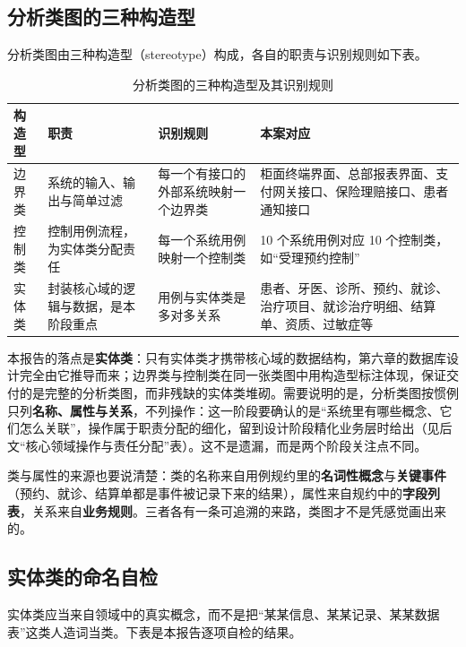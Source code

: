 \documentclass[11pt,a4paper]{ctexart}
\begin{document}
\subsection{分析类图的三种构造型}

分析类图由三种构造型（stereotype）构成，各自的职责与识别规则如下表。

\begin{table}[H]
\centering
\caption{分析类图的三种构造型及其识别规则}
\begin{tabularx}{\linewidth}{@{}L{1.8cm}L{4.0cm}L{3.9cm}X@{}}
\toprule
\textbf{\textcolor{adcblue!92}{构造型}} & \textbf{\textcolor{adcblue!92}{职责}} & \textbf{\textcolor{adcblue!92}{识别规则}} & \textbf{\textcolor{adcblue!92}{本案对应}} \\
\midrule
边界类 & 系统的输入、输出与简单过滤 & 每一个有接口的外部系统映射一个边界类 & 柜面终端界面、总部报表界面、支付网关接口、保险理赔接口、患者通知接口 \\
控制类 & 控制用例流程，为实体类分配责任 & 每一个系统用例映射一个控制类 & 10 个系统用例对应 10 个控制类，如“受理预约控制” \\
实体类 & 封装核心域的逻辑与数据，是本阶段重点 & 用例与实体类是多对多关系 & 患者、牙医、诊所、预约、就诊、治疗项目、就诊治疗明细、结算单、资质、过敏症等 \\
\bottomrule
\end{tabularx}
\end{table}

本报告的落点是\textbf{实体类}：只有实体类才携带核心域的数据结构，第六章的数据库设计完全由它推导而来；边界类与控制类在同一张类图中用构造型标注体现，保证交付的是完整的分析类图，而非残缺的实体类堆砌。需要说明的是，分析类图按惯例只列\textbf{名称、属性与关系}，不列操作：这一阶段要确认的是“系统里有哪些概念、它们怎么关联”，操作属于职责分配的细化，留到设计阶段精化业务层时给出（见后文“核心领域操作与责任分配”表）。这不是遗漏，而是两个阶段关注点不同。

类与属性的来源也要说清楚：类的名称来自用例规约里的\textbf{名词性概念}与\textbf{关键事件}（预约、就诊、结算单都是事件被记录下来的结果），属性来自规约中的\textbf{字段列表}，关系来自\textbf{业务规则}。三者各有一条可追溯的来路，类图才不是凭感觉画出来的。

\subsection{实体类的命名自检}

实体类应当来自领域中的真实概念，而不是把“某某信息、某某记录、某某数据表”这类人造词当类。下表是本报告逐项自检的结果。
\end{document}
